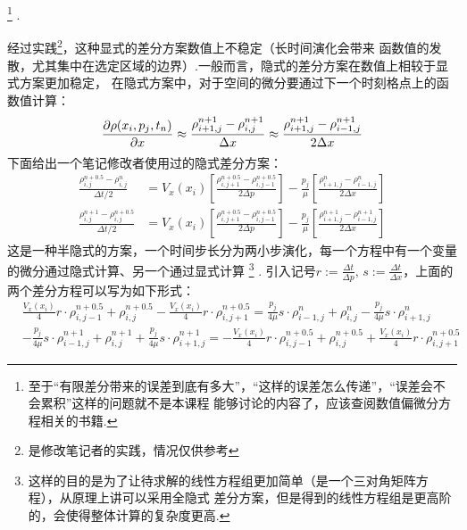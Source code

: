     \footnote{
        至于“有限差分带来的误差到底有多大”，“这样的误差怎么传递”，“误差会不会累积”这样的问题就不是本课程
        能够讨论的内容了，应该查阅数值偏微分方程相关的书籍.
    }
    .
    \par 
    经过实践\footnote{是修改笔记者的实践，情况仅供参考}，这种显式的差分方案数值上不稳定（长时间演化会带来
    函数值的发散，尤其集中在选定区域的边界）.一般而言，隐式的差分方案在数值上相较于显式方案更加稳定，
    在隐式方案中，对于空间的微分要通过下一个时刻格点上的函数值计算：
    \begin{equation}
        \frac{\partial{\rho(x_i, p_j, t_n)}}{\partial{x}} \approx \frac{\rho_{i + 1, j}^{n+1} - \rho_{i, j}^{n+1}}{\Delta x}
             \approx \frac{\rho_{i + 1, j}^{n+1} - \rho_{i-1, j}^{n+1}}{2\Delta x}
    \end{equation}
    下面给出一个笔记修改者使用过的隐式差分方案：
    \begin{equation}
        \begin{split}
            \frac{\rho_{i,j}^{n+0.5} - \rho_{i,j}^{n}}{\Delta t/2} &= V_{x}(x_{i})\left[\frac{\rho_{i,j+1}^{n+0.5} - 
            \rho_{i,j-1}^{n+0.5}}{2\Delta p}\right] - \frac{p_{j}}{\mu}\left[\frac{\rho_{i+1,j}^{n} - 
            \rho_{i-1,j}^{n}}{2\Delta x}\right]\\
            \frac{\rho_{i,j}^{n+1} - \rho_{i,j}^{n+0.5}}{\Delta t/2} &= V_{x}(x_{i})\left[\frac{\rho_{i,j+1}^{n+0.5} -
            \rho_{i,j-1}^{n+0.5}}{2\Delta p}\right] - \frac{p_{j}}{\mu}\left[\frac{\rho_{i+1,j}^{n+1} - 
            \rho_{i-1,j}^{n+1}}{2\Delta x}\right]
        \end{split}
    \end{equation}
    这是一种半隐式的方案，一个时间步长分为两小步演化，每一个方程中有一个变量的微分通过隐式计算、另一个通过显式计算
    \footnote{
        这样的目的是为了让待求解的线性方程组更加简单（是一个三对角矩阵方程），从原理上讲可以采用全隐式
        差分方案，但是得到的线性方程组是更高阶的，会使得整体计算的复杂度更高.
    }
    .
    引入记号$r:=\frac{\Delta t}{\Delta p},\, s:=\frac{\Delta t}{\Delta x}$，上面的两个差分方程可以写为如下形式：
    \begin{equation}
        \begin{split}
            &\frac{V_{x}(x_{i})}{4}r\cdot\rho_{i,j-1}^{n+0.5} + \rho_{i,j}^{n+0.5} - \frac{V_{x}(x_{i})}{4}r\cdot\rho_{i,j+1}^{n+0.5} =
             \frac{p_{j}}{4\mu}s\cdot\rho_{i-1,j}^{n} + \rho_{i,j}^{n} - \frac{p_{j}}{4\mu}s\cdot\rho_{i+1,j}^{n} \\
            &- \frac{p_{j}}{4\mu}s\cdot\rho_{i-1,j}^{n+1} + \rho_{i,j}^{n+1} + \frac{p_{j}}{4\mu}s\cdot\rho_{i+1,j}^{n+1} =
            -\frac{V_{x}(x_{i})}{4}r\cdot\rho_{i,j-1}^{n+0.5} + \rho_{i,j}^{n+0.5} + \frac{V_{x}(x_{i})}{4}r\cdot\rho_{i,j+1}^{n+0.5}
        \end{split}
    \end{equation}
